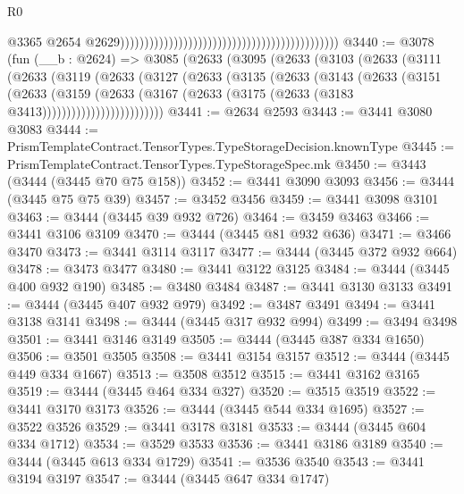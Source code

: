 \begin{lexlean}{R0}
\begin{coremodule}
                                                                                              @3365
                                                                                              @2654
                                                                                              @2629)))))))))))))))))))))))))))))))))))))))))))))
@3440 := @3078
    (fun (__b : @2624) =>
    @3085
      (@2633
        (@3095
          (@2633
            (@3103
              (@2633
                (@3111
                  (@2633
                    (@3119
                      (@2633
                        (@3127
                          (@2633
                            (@3135
                              (@2633
                                (@3143
                                  (@2633
                                    (@3151
                                      (@2633
                                        (@3159
                                          (@2633
                                            (@3167
                                              (@2633
                                                (@3175 (@2633 (@3183 @3413)))))))))))))))))))))))))
@3441 := @2634 @2593
@3443 := @3441 @3080 @3083
@3444 := PrismTemplateContract.TensorTypes.TypeStorageDecision.knownType
@3445 := PrismTemplateContract.TensorTypes.TypeStorageSpec.mk
@3450 := @3443 (@3444 (@3445 @70 @75 @158))
@3452 := @3441 @3090 @3093
@3456 := @3444 (@3445 @75 @75 @39)
@3457 := @3452 @3456
@3459 := @3441 @3098 @3101
@3463 := @3444 (@3445 @39 @932 @726)
@3464 := @3459 @3463
@3466 := @3441 @3106 @3109
@3470 := @3444 (@3445 @81 @932 @636)
@3471 := @3466 @3470
@3473 := @3441 @3114 @3117
@3477 := @3444 (@3445 @372 @932 @664)
@3478 := @3473 @3477
@3480 := @3441 @3122 @3125
@3484 := @3444 (@3445 @400 @932 @190)
@3485 := @3480 @3484
@3487 := @3441 @3130 @3133
@3491 := @3444 (@3445 @407 @932 @979)
@3492 := @3487 @3491
@3494 := @3441 @3138 @3141
@3498 := @3444 (@3445 @317 @932 @994)
@3499 := @3494 @3498
@3501 := @3441 @3146 @3149
@3505 := @3444 (@3445 @387 @334 @1650)
@3506 := @3501 @3505
@3508 := @3441 @3154 @3157
@3512 := @3444 (@3445 @449 @334 @1667)
@3513 := @3508 @3512
@3515 := @3441 @3162 @3165
@3519 := @3444 (@3445 @464 @334 @327)
@3520 := @3515 @3519
@3522 := @3441 @3170 @3173
@3526 := @3444 (@3445 @544 @334 @1695)
@3527 := @3522 @3526
@3529 := @3441 @3178 @3181
@3533 := @3444 (@3445 @604 @334 @1712)
@3534 := @3529 @3533
@3536 := @3441 @3186 @3189
@3540 := @3444 (@3445 @613 @334 @1729)
@3541 := @3536 @3540
@3543 := @3441 @3194 @3197
@3547 := @3444 (@3445 @647 @334 @1747)

\end{coremodule}
\end{lexlean}
